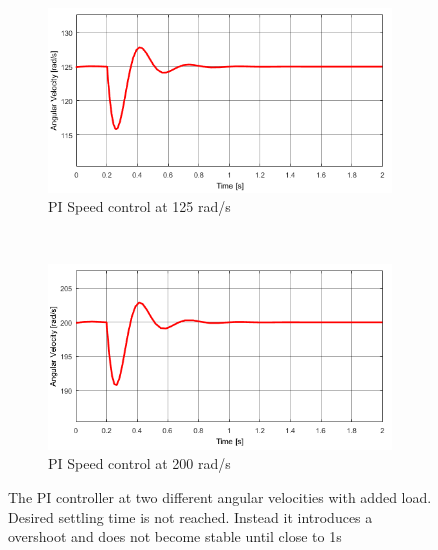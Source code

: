 \begin{figure}[h!]
	\centering
	\begin{subfigure}[b]{0.45\textwidth}
		\includegraphics[width=\textwidth]{graphics/PI_load125}
		\caption{PI Speed control at 125 rad/s}
		\label{fig:piload125}
	\end{subfigure}
	~ %
	\begin{subfigure}[b]{0.45\textwidth}
		\includegraphics[width=\textwidth]{graphics/PI_load200}
		\caption{PI Speed control at 200 rad/s}
		\label{fig:piload200}
	\end{subfigure}
	\caption{The PI controller at two different angular velocities with added load. Desired settling time is not reached. Instead it introduces a overshoot and does not become stable until close to 1s}
	\label{fig:piload}
\end{figure}


